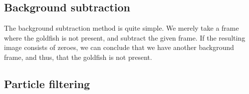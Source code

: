 \documentclass[english]{report}
\begin{document}
\begin{spacing}{1.1}
\subsection{Background subtraction}

The background subtraction method is quite simple. We merely take a
frame where the goldfish is not present, and subtract the given frame.
If the resulting image consists of zeroes, we can conclude that we have
another background frame, and thus, that the goldfish is not present.

\subsection{Particle filtering}

\end{spacing}
\end{document}
